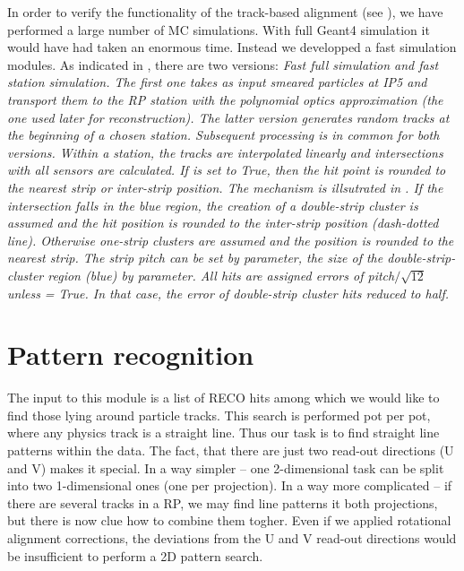 In order to verify the functionality of the track-based alignment (see ), we have performed a large number of MC simulations. With full Geant4 simulation it would have had taken an enormous time. Instead we developped a fast simulation modules. As indicated in , there are two versions: \em{Fast full simulation} and \em{fast station simulation}. The first one takes as input smeared particles at IP5 and transport them to the RP station with the polynomial optics approximation (the one used later for reconstruction). The latter version generates random tracks at the beginning of a chosen station. Subsequent processing is in common for both versions. Within a station, the tracks are interpolated linearly and intersections with all sensors are calculated. If  is set to True, then the hit point is rounded to the nearest strip or inter-strip position. The mechanism is illsutrated in . If the intersection falls in the blue region, the creation of a double-strip cluster is assumed and the hit position is rounded to the inter-strip position (dash-dotted line). Otherwise one-strip clusters are assumed and the position is rounded to the nearest strip. The strip pitch can be set by  parameter, the size of the double-strip-cluster region (blue) by  parameter. All hits are assigned errors of pitch$/\sqrt{12}$ unless  = True. In that case, the error of double-strip cluster hits reduced to half.



\section[pattern reco]{Pattern recognition}



The input to this module is a list of RECO hits among which we would like to find those lying around particle tracks. This search is performed pot per pot, where any physics track is a straight line. Thus our task is to find straight line patterns within the data. The fact, that there are just two read-out directions (U and V) makes it special. In a way simpler -- one 2-dimensional task can be split into two 1-dimensional ones (one per projection). In a way more complicated -- if there are several tracks in a RP, we may find line patterns it both projections, but there is now clue how to combine them togher.
Even if we applied rotational alignment corrections, the deviations from the U and V read-out directions would be insufficient to perform a 2D pattern search. 

